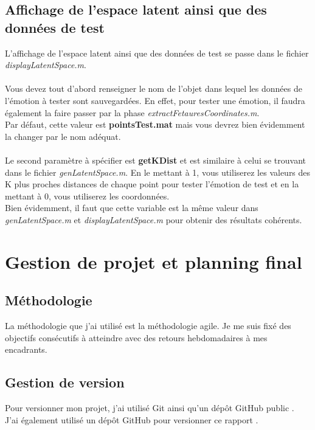 \documentclass[poster]{polytech/polytech}
\begin{document}
\section{Affichage de l'espace latent ainsi que des données de test}
L'affichage de l'espace latent ainsi que des données de test se passe dans le fichier \textit{displayLatentSpace.m}.\\
\\
Vous devez tout d'abord renseigner le nom de l'objet dans lequel les données de l'émotion à tester sont sauvegardées. En effet, pour tester une émotion, il faudra également la faire passer par la phase \textit{extractFetauresCoordinates.m}.\\
Par défaut, cette valeur est \textbf{pointsTest.mat} mais vous devrez bien évidemment la changer par le nom adéquat.\\
\\
Le second paramètre à spécifier est \textbf{getKDist} et est similaire à celui se trouvant dans le fichier \textit{genLatentSpace.m}. En le mettant à 1, vous utiliserez les valeurs des K plus proches distances de chaque point pour tester l'émotion de test et en la mettant à 0, vous utiliserez les coordonnées.\\
Bien évidemment, il faut que cette variable est la même valeur dans \textit{genLatentSpace.m} et \textit{displayLatentSpace.m} pour obtenir des résultats cohérents.

\chapter{Gestion de projet et planning final}
\section{Méthodologie}
La méthodologie que j'ai utilisé est la méthodologie agile. Je me suis fixé des objectifs consécutifs à atteindre avec des retours hebdomadaires à mes encadrants.

\section{Gestion de version}
Pour versionner mon projet, j'ai utilisé Git ainsi qu'un dépôt GitHub public \cite{githubflo}.\\
J'ai également utilisé un dépôt GitHub pour versionner ce rapport \cite{githubflo2}.
\end{document}
